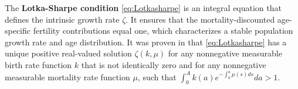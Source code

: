 \documentclass[journal,twoside,web]{ieeecolor}
\newtheorem{lemma}{Lemma}
\begin{document}
The \textbf{Lotka-Sharpe condition} \eqref{eq:Lotkasharpe}
 is an integral equation that defines the intrinsic growth rate $\zeta$. 
It ensures that the mortality-discounted age-specific fertility contributions equal one, which characterizes a stable population growth rate and age distribution.
It was proven in \cite{sharpe1911problem}  that  \eqref{eq:Lotkasharpe}
has a unique positive real-valued solution $\zeta(k,\mu)$ for any nonnegative measurable birth rate function $k$ that is not identically zero and for any nonnegative measurable mortality rate function $\mu$, such that $\int_0^A k(a)e^{-\int_0^a \mu(s)ds}da > 1$.
\end{document}
